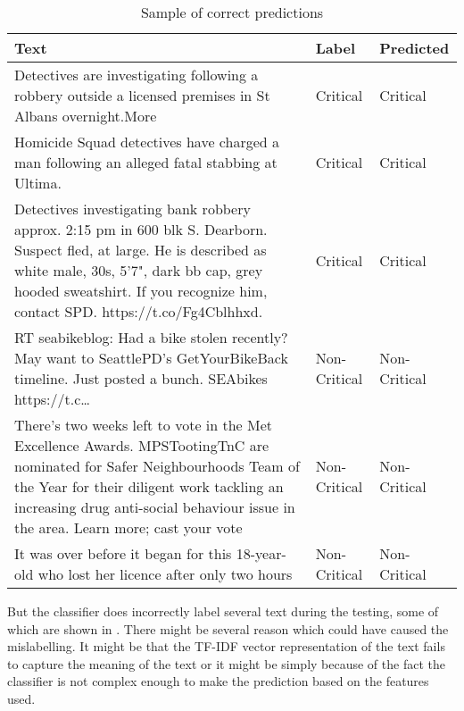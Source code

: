 \begin{table}
\begin{center}
\caption{Sample of correct predictions}
\label{tbl:correct_predictions}
\begin{tabular}{p{10cm}p{2cm}p{2cm}}
\toprule 
Text&Label&Predicted\\
\midrule 
Detectives are investigating following a robbery outside a licensed premises in St Albans overnight.More &Critical&Critical\\
\hline
Homicide Squad detectives have charged a man following an alleged fatal stabbing at Ultima.&Critical&Critical\\
\hline
Detectives investigating bank robbery approx. 2:15 pm in 600 blk S. Dearborn.  Suspect fled, at large. He is described as white male, 30s, 5'7", dark bb cap, grey hooded sweatshirt. If you recognize him, contact SPD. https://t.co/Fg4Cblhhxd.&Critical&Critical\\
\hline
RT seabikeblog: Had a bike stolen recently? May want to SeattlePD’s GetYourBikeBack timeline. Just posted a bunch. SEAbikes https://t.c…
&Non-Critical&Non-Critical\\
\hline
There's two weeks left to vote in the Met Excellence Awards. MPSTootingTnC are nominated for Safer Neighbourhoods Team of the Year for their diligent work tackling an increasing drug anti-social behaviour issue in the area. Learn more; cast your vote&Non-Critical&Non-Critical\\
\hline
It was over before it began for this 18-year-old who lost her licence after only two hours&Non-Critical&Non-Critical\\
\bottomrule
\end{tabular}
\end{center}
\end{table}

But the classifier does incorrectly label several text during the testing, some of which are shown in . There might be several reason which could have caused the mislabelling. It might be that the TF-IDF vector representation of the text fails to capture the meaning of the text or it might be simply because of the fact the classifier is not complex enough to make the prediction based on the features used.

